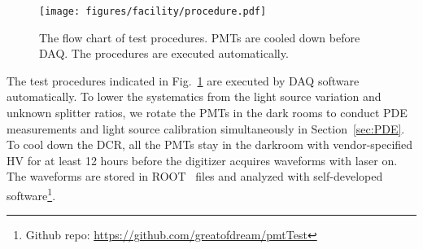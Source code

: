 \begin{figure}
    \centering
    \texttt{[image: figures/facility/procedure.pdf]}
    \caption{The flow chart of test procedures. PMTs are cooled down before DAQ. The procedures are executed automatically.}
    \label{fig:testingprocedure}
\end{figure}

The test procedures indicated in Fig.~\ref{fig:testingprocedure} are executed by DAQ software automatically. To lower the systematics from the light source variation and unknown splitter ratios, we rotate the PMTs in the dark rooms to conduct PDE measurements and light source calibration simultaneously in Section~\ref{sec:PDE}. To cool down the DCR, all the PMTs stay in the darkroom with vendor-specified HV for at least 12 hours before the digitizer acquires waveforms with laser on. The waveforms are stored in ROOT~\cite{brun_root_1997} files and analyzed with self-developed software\footnote{Github repo: \url{https://github.com/greatofdream/pmtTest}}.
